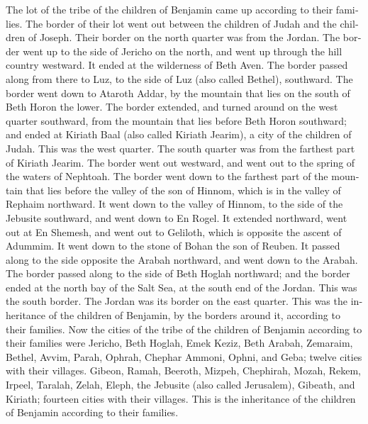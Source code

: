 \begin{paracol}{2}
\begin{otherlanguage}{english}
 The lot of the tribe of the children of Benjamin came up
according to their families. The border of their lot went out between
the children of Judah and the children of Joseph.  Their
border on the north quarter was from the Jordan. The border went up to
the side of Jericho on the north, and went up through the hill country
westward. It ended at the wilderness of Beth Aven.  The
border passed along from there to Luz, to the side of Luz (also called
Bethel), southward. The border went down to Ataroth Addar, by the
mountain that lies on the south of Beth Horon the lower. 
The border extended, and turned around on the west quarter southward,
from the mountain that lies before Beth Horon southward; and ended at
Kiriath Baal (also called Kiriath Jearim), a city of the children of
Judah. This was the west quarter.  The south quarter was
from the farthest part of Kiriath Jearim. The border went out westward,
and went out to the spring of the waters of Nephtoah. 
The border went down to the farthest part of the mountain that lies
before the valley of the son of Hinnom, which is in the valley of
Rephaim northward. It went down to the valley of Hinnom, to the side of
the Jebusite southward, and went down to En Rogel.  It
extended northward, went out at En Shemesh, and went out to Geliloth,
which is opposite the ascent of Adummim. It went down to the stone of
Bohan the son of Reuben.  It passed along to the side
opposite the Arabah northward, and went down to the Arabah.
 The border passed along to the side of Beth Hoglah
northward; and the border ended at the north bay of the Salt Sea, at the
south end of the Jordan. This was the south border.  The
Jordan was its border on the east quarter. This was the inheritance of
the children of Benjamin, by the borders around it, according to their
families.  Now the cities of the tribe of the children of
Benjamin according to their families were Jericho, Beth Hoglah, Emek
Keziz,  Beth Arabah, Zemaraim, Bethel, 
Avvim, Parah, Ophrah,  Chephar Ammoni, Ophni, and Geba;
twelve cities with their villages.  Gibeon, Ramah,
Beeroth,  Mizpeh, Chephirah, Mozah, 
Rekem, Irpeel, Taralah,  Zelah, Eleph, the Jebusite (also
called Jerusalem), Gibeath, and Kiriath; fourteen cities with their
villages. This is the inheritance of the children of Benjamin according
to their families.


\end{otherlanguage}
\end{paracol}
